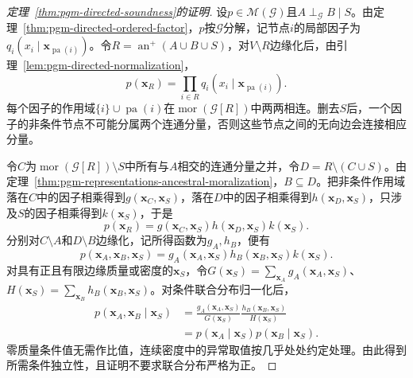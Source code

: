 \begin{proof}[定理~\ref{thm:pgm-directed-soundness}的证明]
设$p\in\mathcal{M}(\mathcal{G})$且$A\perp_{\mathcal{G}}B\mid S$。由定理~\ref{thm:pgm-directed-ordered-factor}，$p$按$\mathcal{G}$分解，记节点$i$的局部因子为$q_i(x_i\mid\bm{x}_{\operatorname{pa}(i)})$。令$R=\operatorname{an}^{+}(A\cup B\cup S)$，对$V\setminus R$边缘化后，由引理~\ref{lem:pgm-directed-normalization}，
\[
  p(\bm{x}_R)=
  \prod_{i\in R}q_i(x_i\mid\bm{x}_{\operatorname{pa}(i)}).
\]
每个因子的作用域$\{i\}\cup\operatorname{pa}(i)$在$\operatorname{mor}(\mathcal{G}[R])$中两两相连。删去$S$后，一个因子的非条件节点不可能分属两个连通分量，否则这些节点之间的无向边会连接相应分量。

令$C$为$\operatorname{mor}(\mathcal{G}[R])\setminus S$中所有与$A$相交的连通分量之并，令$D=R\setminus(C\cup S)$。由定理~\ref{thm:pgm-representations-ancestral-moralization}，$B\subseteq D$。把非条件作用域落在$C$中的因子相乘得到$g(\bm{x}_C,\bm{x}_S)$，落在$D$中的因子相乘得到$h(\bm{x}_D,\bm{x}_S)$，只涉及$S$的因子相乘得到$k(\bm{x}_S)$，于是
\[
  p(\bm{x}_R)=
  g(\bm{x}_C,\bm{x}_S)
  h(\bm{x}_D,\bm{x}_S)
  k(\bm{x}_S).
\]
分别对$C\setminus A$和$D\setminus B$边缘化，记所得函数为$g_A,h_B$，便有
\[
  p(\bm{x}_A,\bm{x}_B,\bm{x}_S)=
  g_A(\bm{x}_A,\bm{x}_S)
  h_B(\bm{x}_B,\bm{x}_S)
  k(\bm{x}_S).
\]
对具有正且有限边缘质量或密度的$\bm{x}_S$，令$G(\bm{x}_S)=\sum_{\bm{x}_A}g_A(\bm{x}_A,\bm{x}_S)$、$H(\bm{x}_S)=\sum_{\bm{x}_B}h_B(\bm{x}_B,\bm{x}_S)$。对条件联合分布归一化后，
\[
  \begin{aligned}
    p(\bm{x}_A,\bm{x}_B\mid\bm{x}_S)
      &=\frac{g_A(\bm{x}_A,\bm{x}_S)}{G(\bm{x}_S)}
        \frac{h_B(\bm{x}_B,\bm{x}_S)}{H(\bm{x}_S)}\\
      &=p(\bm{x}_A\mid\bm{x}_S)
        p(\bm{x}_B\mid\bm{x}_S).
  \end{aligned}
\]
零质量条件值无需作比值，连续密度中的异常取值按几乎处处约定处理。由此得到所需条件独立性，且证明不要求联合分布严格为正。
\end{proof}

